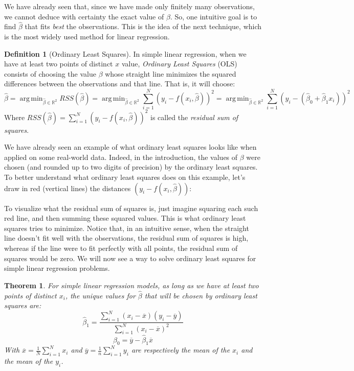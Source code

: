 \documentclass{article}
\newtheorem{theorem}{Theorem}[section]
\theoremstyle{definition}
\newtheorem{definition}{Definition}[section]
\theoremstyle{remark}
\theoremstyle{example}
\DeclareMathOperator*{\argmin}{arg\,min}
\newcommand{\betat}{\hat{\beta}}
\begin{document}
We have already seen that, since we have made only finitely many observations, we cannot deduce with certainty the exact value of $\beta$. So, one intuitive goal is to find $\betat$ that fits \textit{best} the observations. This is the idea of the next technique, which is the most widely used method for linear regression.

\begin{definition}[Ordinary Least Squares]
		In simple linear regression, when we have at least two points of distinct $x$ value, \textit{Ordinary Least Squares} (OLS) consists of choosing the value $\beta$ whose straight line minimizes the squared differences between the observations and that line. That is, it will choose:
				$$\betat = \argmin_{\betat \in \mathbb{R}^2} RSS(\betat) = \argmin_{\betat \in \mathbb{R}^2} \sum_{i=1}^N (y_i - f(x_i, \betat))^2 = \argmin_{\betat \in \mathbb{R}^2} \sum_{i=1}^N (y_i - (\betat_0 + \betat_1 x_i))^2$$
		Where $RSS(\betat) = \sum_{i=1}^N (y_i - f(x_i, \betat))^2$ is called the \textit{residual sum of squares}.
\end{definition}

We have already seen an example of what ordinary least squares looks like when applied on some real-world data. Indeed, in the introduction, the values of $\beta$ were chosen (and rounded up to two digits of precision) by the ordinary least squares. To better understand what ordinary least squares does on this example, let's draw in red (vertical lines) the distances $(y_i - f(x_i, \betat))$:

\begin{figure}[h!]
		\centering
		\scalebox{0.7}{}
\end{figure}

To visualize what the residual sum of squares is, just imagine squaring each such red line, and then summing these squared values. This is what ordinary least squares tries to minimize. Notice that, in an intuitive sense, when the straight line doesn't fit well with the observations, the residual sum of squares is high, whereas if the line were to fit perfectly with all points, the residual sum of squares would be zero. We will now see a way to solve ordinary least squares for simple linear regression problems.

\begin{theorem} %
		For simple linear regression models, as long as we have at least two points of distinct $x_i$, the \textit{unique} values for $\betat$ that will be chosen by ordinary least squares are:
				$$\betat_1 = \frac{\sum_{i=1}^N (x_i - \overline{x})(y_i - \overline{y})}{\sum_{i=1}^N (x_i - \overline{x})^2}$$
				$$\betat_0 = \overline{y} - \betat_1 \overline{x}$$
		With $\overline{x} = \frac{1}{N}\sum_{i=1}^N x_i$ and $\overline{y} = \frac{1}{n}\sum_{i=1}^N y_i$ are respectively the mean of the $x_i$ and the mean of the $y_i$.
\end{theorem}
\end{document}
